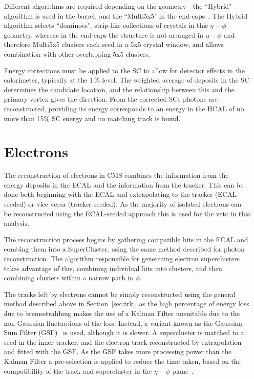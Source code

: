  Different algorithms are required depending on the geometry - the ``Hybrid" algorithm is used in the barrel, and the ``Multi5x5" in the end-caps~\cite{EGM-10-005}. The Hybrid algorithm selects ``dominoes", strip-like collections of crystals in this $\eta - \phi$ geometry, whereas in the end-caps the structure is not arranged in $\eta - \phi$ and therefore Multi5x5 clusters each seed in a 5x5 crystal window, and allows combination with other overlapping 5x5 clusters.

Energy corrections must be applied to the SC to allow for detector effects in the calorimeter, typically at the 1\,\% level. The weighted average of deposits in the SC determines the candidate location, and the relationship between this and the primary vertex gives the direction. From the corrected SCs photons are reconstructed, providing its energy corresponds to an energy in the HCAL of no more than 15\% SC energy and no matching track is found. 

\section{Electrons}

The reconstruction of electrons in CMS combines the information from the energy deposits in the ECAL and the information from the tracker. This can be done both beginning with the ECAL and extrapolating to the tracker (ECAL-seeded) or vice versa (tracker-seeded). As the majority of isolated electrons can be reconstructed using the ECAL-seeded approach this is used for the veto in this analysis. 

The reconstruction process begins by gathering compatible hits in the ECAL and combing them into a SuperCluster, using the same method described for photon reconstruction. The algorithm responsible for generating electron superclusters takes advantage of this, combining individual hits into clusters, and then combining clusters within a narrow path in $\phi$. 

The tracks left by electrons cannot be simply reconstructed using the general method described above in Section~\ref{sec:trk}, as the high percentage of energy loss due to bremsstrahlung makes the use of a Kalman Filter unsuitable due to the non-Gaussian fluctuations of the loss. Instead, a variant known as the Gaussian Sum Filter (GSF)~\cite{gsf} is used, although it is slower. A supercluster is matched to a seed in the inner tracker, and the electron track reconstructed by extrapolation and fitted with the GSF.  As the GSF takes more processing power than the Kalman Filter a pre-selection is applied to reduce the time taken, based on the compatibility of the track and supercluster in the $\eta - \phi$ plane~\cite{EGM-10-004}.



